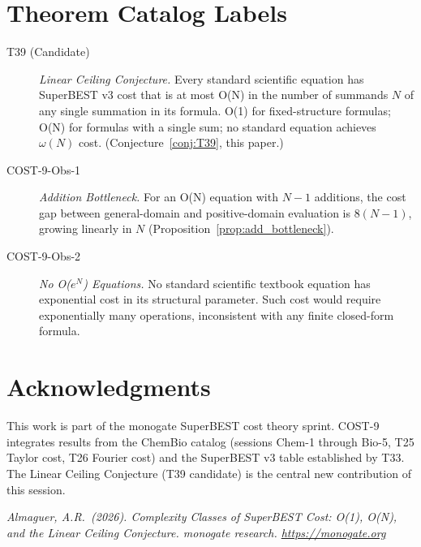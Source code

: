 \documentclass[12pt,a4paper]{article}
\theoremstyle{definition}
\begin{document}
\section*{Theorem Catalog Labels}

\begin{description}
  \item[T39 (Candidate)] \emph{Linear Ceiling Conjecture.}
        Every standard scientific equation has SuperBEST v3 cost that
        is at most O(N) in the number of summands $N$ of any single
        summation in its formula.  O(1) for fixed-structure formulas;
        O(N) for formulas with a single sum; no standard equation
        achieves $\omega(N)$ cost.
        (Conjecture~\ref{conj:T39}, this paper.)

  \item[COST-9-Obs-1] \emph{Addition Bottleneck.}
        For an O(N) equation with $N-1$ additions, the cost gap
        between general-domain and positive-domain evaluation is
        $8(N-1)$, growing linearly in $N$
        (Proposition~\ref{prop:add_bottleneck}).

  \item[COST-9-Obs-2] \emph{No O($e^N$) Equations.}
        No standard scientific textbook equation has exponential cost
        in its structural parameter.  Such cost would require
        exponentially many operations, inconsistent with any finite
        closed-form formula.
\end{description}

\section*{Acknowledgments}

This work is part of the monogate SuperBEST cost theory sprint.
COST-9 integrates results from the ChemBio catalog (sessions Chem-1
through Bio-5, T25 Taylor cost, T26 Fourier cost) and the
SuperBEST v3 table established by T33.  The Linear Ceiling Conjecture
(T39 candidate) is the central new contribution of this session.

\bigskip
\noindent\textit{Almaguer, A.R.\ (2026).
Complexity Classes of SuperBEST Cost: O(1), O(N), and the Linear Ceiling Conjecture.
monogate research. \url{https://monogate.org}}
\end{document}
